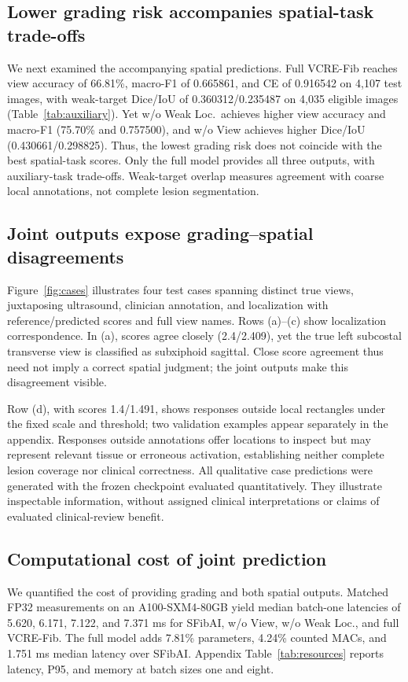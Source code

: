 \subsection{Lower grading risk accompanies spatial-task trade-offs}
We next examined the accompanying spatial predictions. Full VCRE-Fib reaches view accuracy of 66.81\%, macro-F1 of 0.665861, and CE of 0.916542 on 4,107 test images, with weak-target Dice/IoU of 0.360312/0.235487 on 4,035 eligible images (Table~\ref{tab:auxiliary}). Yet w/o Weak Loc.\ achieves higher view accuracy and macro-F1 (75.70\% and 0.757500), and w/o View achieves higher Dice/IoU (0.430661/0.298825). Thus, the lowest grading risk does not coincide with the best spatial-task scores. Only the full model provides all three outputs, with auxiliary-task trade-offs. Weak-target overlap measures agreement with coarse local annotations, not complete lesion segmentation.

\subsection{Joint outputs expose grading--spatial disagreements}
Figure~\ref{fig:cases} illustrates four test cases spanning distinct true views, juxtaposing ultrasound, clinician annotation, and localization with reference/predicted scores and full view names. Rows (a)--(c) show localization correspondence. In (a), scores agree closely (2.4/2.409), yet the true left subcostal transverse view is classified as subxiphoid sagittal. Close score agreement thus need not imply a correct spatial judgment; the joint outputs make this disagreement visible.

Row (d), with scores 1.4/1.491, shows responses outside local rectangles under the fixed scale and threshold; two validation examples appear separately in the appendix. Responses outside annotations offer locations to inspect but may represent relevant tissue or erroneous activation, establishing neither complete lesion coverage nor clinical correctness. All qualitative case predictions were generated with the frozen checkpoint evaluated quantitatively. They illustrate inspectable information, without assigned clinical interpretations or claims of evaluated clinical-review benefit.


\subsection{Computational cost of joint prediction}
We quantified the cost of providing grading and both spatial outputs. Matched FP32 measurements on an A100-SXM4-80GB yield median batch-one latencies of 5.620, 6.171, 7.122, and 7.371 ms for SFibAI, w/o View, w/o Weak Loc., and full VCRE-Fib. The full model adds 7.81\% parameters, 4.24\% counted MACs, and 1.751 ms median latency over SFibAI. Appendix Table~\ref{tab:resources} reports latency, P95, and memory at batch sizes one and eight.
